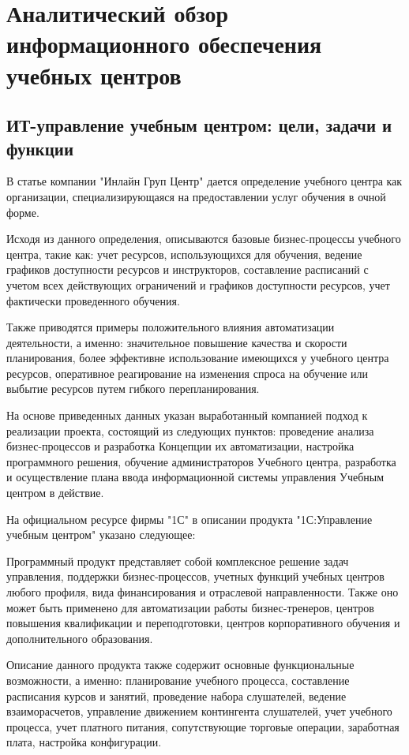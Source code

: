 \section{Аналитический обзор информационного обеспечения учебных центров}
\subsection{ИТ-управление учебным центром: цели, задачи и функции}

В статье компании "Инлайн Груп Центр" \cite{inlinegroup-c} дается определение учебного центра как организации, специализирующаяся на предоставлении услуг обучения в очной форме.

Исходя из данного определения, описываются базовые бизнес-процессы учебного центра, такие как: учет ресурсов, использующихся для обучения, ведение графиков доступности ресурсов и инструкторов, составление расписаний с учетом всех действующих ограничений и графиков доступности ресурсов, учет фактически проведенного обучения.

Также приводятся примеры положительного влияния автоматизации деятельности, а именно: значительное повышение качества и скорости планирования, более эффективне использование имеющихся у учебного центра ресурсов, оперативное реагирование на изменения спроса на обучение или выбытие ресурсов путем гибкого перепланирования.

На основе приведенных данных указан выработанный компанией подход к реализации проекта, состоящий из следующих пунктов: проведение анализа бизнес-процессов и разработка Концепции их автоматизации, настройка программного решения, обучение администраторов Учебного центра, разработка и осуществление плана ввода информационной системы управления Учебным центром в действие.

На официальном ресурсе фирмы "1С" \cite{1c-training-center} в описании продукта "1С:Управление учебным центром" указано следующее:

Программный продукт представляет собой комплексное решение задач управления, поддержки бизнес-процессов, учетных функций учебных центров любого профиля, вида финансирования и отраслевой направленности.
Также оно может быть применено для автоматизации работы бизнес-тренеров, центров повышения квалификации и переподготовки, центров корпоративного обучения и дополнительного образования.

Описание данного продукта также содержит основные функциональные возможности, а именно: планирование учебного процесса, составление расписания курсов и занятий, проведение набора слушателей, ведение взаиморасчетов, управление движением контингента слушателей, учет учебного процесса, учет платного питания, сопутствующие торговые операции, заработная плата, настройка конфигурации.

